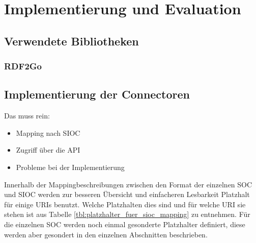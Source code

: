 
\chapter{Implementierung und Evaluation} %
\label{cha:implementierung_und_evaluation}

\section{Verwendete Bibliotheken} %
\label{sec:verwendete_bibliotheken}

\subsection{RDF2Go} %
\label{sub:rdf2go}





\section{Implementierung der Connectoren} %
\label{sec:implementierung_der_connectoren}

Das muss rein:
\begin{itemize}
    \item Mapping nach SIOC
    \item Zugriff über die API
    \item Probleme bei der Implementierung
\end{itemize}

Innerhalb der Mappingbeschreibungen zwischen den Format der einzelnen SOC und SIOC werden zur besseren Übersicht und einfacheren Lesbarkeit Platzhalt für einige URIs benutzt. Welche Platzhalten dies sind und für welche URI sie stehen ist aus Tabelle \ref{tbl:platzhalter_fuer_sioc_mapping} zu entnehmen. Für die einzelnen SOC werden noch einmal gesonderte Platzhalter definiert, diese werden aber gesondert in den einzelnen Abschnitten beschrieben. 

